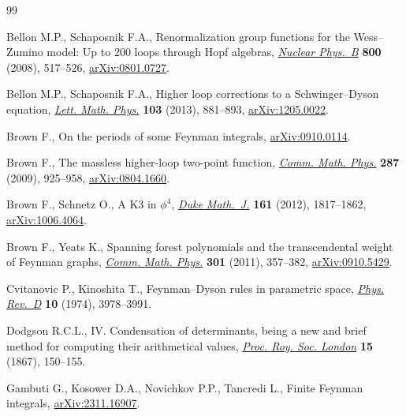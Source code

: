 \documentclass[pdftex]{sigma}
\numberwithin{equation}{section}
\begin{document}
\begin{thebibliography}{99}
\footnotesize\itemsep=0pt

Bellon M.P., Schaposnik F.A., Renormalization group functions for the
 {W}ess--{Z}umino model: {U}p to 200 loops through {H}opf algebras,
 \href{https://doi.org/10.1016/j.nuclphysb.2008.02.005}{\textit{Nuclear Phys.~B}} \textbf{800} (2008), 517--526, \href{https://arxiv.org/abs/0801.0727}{arXiv:0801.0727}.

Bellon M.P., Schaposnik F.A., Higher loop corrections to a {S}chwinger--{D}yson
 equation, \href{https://doi.org/10.1007/s11005-013-0621-x}{\textit{Lett. Math. Phys.}} \textbf{103} (2013), 881--893,
 \href{https://arxiv.org/abs/1205.0022}{arXiv:1205.0022}.

Brown F., On the periods of some {F}eynman integrals, \href{https://arxiv.org/abs/0910.0114}{arXiv:0910.0114}.

Brown F., The massless higher-loop two-point function, \href{https://doi.org/10.1007/s00220-009-0740-5}{\textit{Comm. Math.
 Phys.}} \textbf{287} (2009), 925--958, \href{https://arxiv.org/abs/0804.1660}{arXiv:0804.1660}.

Brown F., Schnetz O., A {K}3 in {$\phi^4$}, \href{https://doi.org/10.1215/00127094-1644201}{\textit{Duke Math.~J.}} \textbf{161}
 (2012), 1817--1862, \href{https://arxiv.org/abs/1006.4064}{arXiv:1006.4064}.

Brown F., Yeats K., Spanning forest polynomials and the transcendental weight
 of {F}eynman graphs, \href{https://doi.org/10.1007/s00220-010-1145-1}{\textit{Comm. Math. Phys.}} \textbf{301} (2011),
 357--382, \href{https://arxiv.org/abs/0910.5429}{arXiv:0910.5429}.

Cvitanovic P., Kinoshita T., {F}eynman--{D}yson rules in parametric space,
 \href{https://doi.org/10.1103/PhysRevD.10.3978}{\textit{Phys. Rev.~D}} \textbf{10} (1974), 3978--3991.

Dodgson R.C.L., IV. Condensation of determinants, being a new and brief method
 for computing their arithmetical values, \href{https://doi.org/10.1098/rspl.1866.0037}{\textit{Proc. Roy. Soc. London}}
 \textbf{15} (1867), 150--155.

Gambuti G., Kosower D.A., Novichkov P.P., Tancredi L., Finite {F}eynman
 integrals, \href{https://arxiv.org/abs/2311.16907}{arXiv:2311.16907}.


\end{thebibliography}
\end{document}
